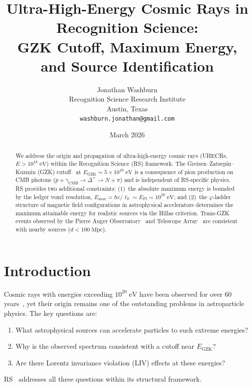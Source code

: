 \documentclass[12pt,a4paper]{article}
\title{Ultra-High-Energy Cosmic Rays in Recognition Science:\\
GZK Cutoff, Maximum Energy, and Source Identification}
\author{Jonathan Washburn\\
Recognition Science Research Institute\\
Austin, Texas\\
\texttt{washburn.jonathan@gmail.com}}
\date{March 2026}
\theoremstyle{definition}
\theoremstyle{remark}
\begin{document}
\maketitle

\begin{abstract}
We address the origin and propagation of ultra-high-energy cosmic
rays (UHECRs, $E > 10^{18}\;\mathrm{eV}$) within the Recognition
Science (RS) framework.  The Greisen--Zatsepin--Kuzmin (GZK)
cutoff~\cite{Greisen1966, ZK1966} at $E_{\mathrm{GZK}} \sim
5 \times 10^{19}\;\mathrm{eV}$ is a consequence of pion production
on CMB photons ($p + \gamma_{\mathrm{CMB}} \to \Delta^+ \to N +
\pi$) and is independent of RS-specific physics.  RS provides two
additional constraints: (1)~the absolute maximum energy is bounded by
the ledger voxel resolution,
$E_{\max} = \hbar c/\ell_0 \sim E_{\mathrm{Pl}} \sim
10^{28}\;\mathrm{eV}$; and (2)~the $\varphi$-ladder structure of
magnetic field configurations in astrophysical accelerators
determines the maximum attainable energy for realistic sources via
the Hillas criterion.  Trans-GZK events observed by the Pierre
Auger Observatory~\cite{Auger2017} and Telescope Array~\cite{TA2014}
are consistent with nearby sources ($d < 100\;\mathrm{Mpc}$).
\end{abstract}

\section{Introduction}
\label{sec:intro}

Cosmic rays with energies exceeding $10^{20}\;\mathrm{eV}$ have
been observed for over 60 years~\cite{Linsley1963}, yet their
origin remains one of the outstanding problems in
astroparticle physics.  The key questions are:
\begin{enumerate}
  \item What astrophysical sources can accelerate particles to
  such extreme energies?
  \item Why is the observed spectrum consistent with a cutoff near
  $E_{\mathrm{GZK}}$?
  \item Are there Lorentz invariance violation (LIV) effects at
  these energies?
\end{enumerate}

RS~\cite{RS_Axioms} addresses all three questions within its
structural framework.
\end{document}
